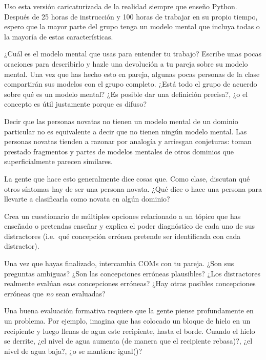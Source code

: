 Uso esta versión caricaturizada de la realidad siempre que enseño Python.
Después de 25 horas de instrucción y 100 horas de trabajar en su propio tiempo,
espero que la mayor parte del grupo tenga un modelo mental
que incluya todas o la mayoría de estas características.



¿Cuál es el modelo mental que usas para entender tu trabajo?
Escribe unas pocas oraciones para describirlo y hazle una devolución a tu pareja sobre su modelo mental.
Una vez que has hecho esto en pareja,
algunas pocas personas de la clase compartirán sus modelos con el grupo completo.
¿Está todo el grupo de acuerdo sobre qué es un modelo mental?
¿Es posible dar una definición precisa?,
¿o el concepto es útil justamente porque es difuso?

Decir que las personas novatas no tienen un modelo mental de un dominio particular
no es equivalente a decir que no tienen ningún modelo mental.
Las personas novatas tienden a razonar por analogía y arriesgan conjeturas:
toman prestado fragmentos y partes de modelos mentales de otros dominios que superficialmente parecen similares.

La gente que hace esto generalmente dice cosas que.
Como clase,
discutan qué otros síntomas hay de ser una persona novata.
¿Qué dice o hace una persona para llevarte a clasificarla como novata en algún dominio?

Crea un cuestionario de múltiples opciones relacionado a un tópico que has enseñado o pretendas enseñar
y explica el poder diagnóstico de cada uno de sus distractores
(i.e.\ qué concepción errónea pretende ser identificada con cada distractor).

Una vez que hayas finalizado, intercambia COMs con tu pareja.
¿Son sus preguntas ambiguas?
¿Son las concepciones erróneas plausibles?
¿Los distractores realmente evalúan esas concepciones erróneas?
¿Hay otras posibles concepciones erróneas que \emph{no} sean evaluadas?

Una buena evaluación formativa requiere que la gente piense profundamente en un problema.
Por ejemplo,
imagina que has colocado un bloque de hielo en un recipiente y luego llenas de agua este recìpiente, hasta el borde.
Cuando el hielo se derrite, ¿el nivel de agua aumenta (de manera que el recipiente rebasa)?, ¿el nivel de agua baja?, ¿o se mantiene igual()?

